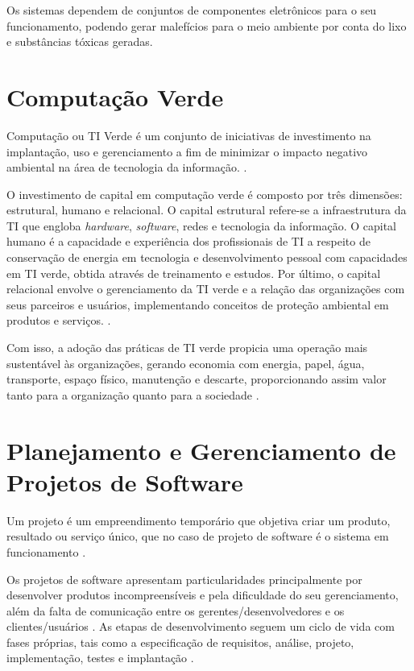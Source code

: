 Os sistemas dependem de conjuntos de componentes eletrônicos para o seu funcionamento, podendo gerar malefícios para o meio ambiente por conta do lixo e substâncias tóxicas geradas.

\section{Computação Verde}

Computação ou TI Verde é um conjunto de iniciativas de investimento na implantação, uso e gerenciamento a fim de minimizar o impacto negativo ambiental na área de tecnologia da informação. \cite{CQP_MMD_2020}.

O investimento de capital em computação verde é composto por três dimensões: estrutural, humano e relacional.
O capital estrutural refere-se a infraestrutura da TI que engloba \textit{hardware}, \textit{software}, redes e tecnologia da informação. O capital humano é a capacidade e experiência dos profissionais de TI a respeito de conservação de energia em tecnologia e desenvolvimento pessoal com capacidades em TI verde, obtida através de treinamento e estudos. Por último, o capital relacional envolve o gerenciamento da TI verde e a relação das organizações com seus parceiros e usuários, implementando conceitos de proteção ambiental em produtos e serviços. \cite{CQP_MMD_2020}.

Com isso, a adoção das práticas de TI verde propicia uma operação mais sustentável às organizações, gerando economia com energia, papel, água, transporte, espaço físico, manutenção e descarte, proporcionando assim valor tanto para a organização quanto para a sociedade \cite{TallesMoura2017}.

\section{Planejamento e Gerenciamento de Projetos de Software}

Um projeto é um empreendimento temporário que objetiva criar um produto, resultado ou serviço único, que no caso de projeto de software é o sistema em funcionamento \cite{Julia_Mara_2018}.

Os projetos de software apresentam particularidades principalmente por desenvolver produtos incompreensíveis e pela dificuldade do seu gerenciamento, além da falta de comunicação entre os gerentes/desenvolvedores e os clientes/usuários \cite{Prado1999}. As etapas de desenvolvimento seguem um ciclo de vida com fases próprias, tais como a especificação de requisitos, análise, projeto, implementação, testes e implantação \cite{Ralf_Teresa_Erica2018}.

